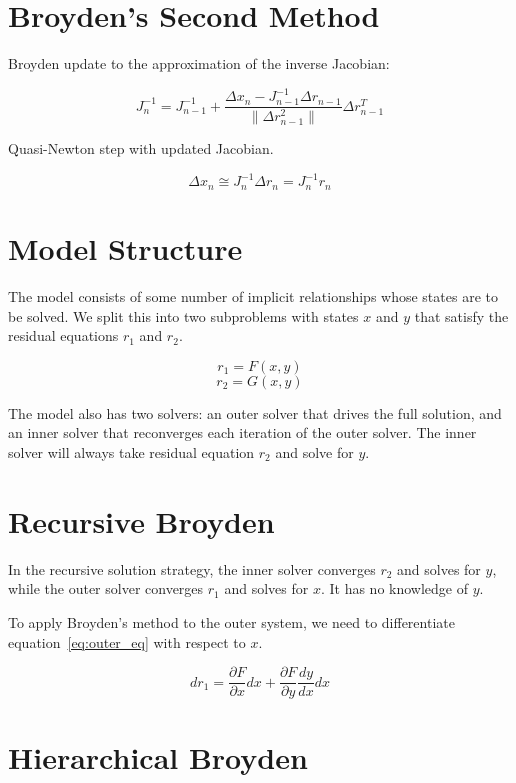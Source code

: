 \documentclass{article}
\begin{document}
\section{Broyden's Second Method}

Broyden update to the approximation of the inverse Jacobian:

\begin{equation}
  J_n^{-1} = J_{n-1}^{-1} + \frac{\Delta x_n - J_{n-1}^{-1} \Delta r_{n-1}}{\| \Delta r_{n-1}^2 \|} \Delta r_{n-1}^T
\end{equation}

Quasi-Newton step with updated Jacobian.

\begin{equation}
  \Delta x_n \cong J_n^{-1} \Delta r_n = J_n^{-1} r_n  \label{eq:newton_update}
\end{equation}

\section{Model Structure}

The model consists of some number of implicit relationships whose states are to be solved. We split this into two subproblems with
states $x$ and $y$ that satisfy the residual equations $r_1$ and $r_2$.

\begin{equation}
  r_1 = F(x, y)  \label{eq:outer_eq}
\end{equation}
\begin{equation}
  r_2 = G(x, y)  \label{eq:inner_eq}
\end{equation}

The model also has two solvers: an outer solver that drives the full solution, and an inner solver that reconverges each
iteration of the outer solver. The inner solver will always take residual equation $r_2$ and solve for $y$.

\section{Recursive Broyden}

In the recursive solution strategy, the inner solver converges $r_2$ and solves for $y$, while the outer solver converges
$r_1$ and solves for $x$.  It has no knowledge of $y$.

To apply Broyden's method to the outer system, we need to differentiate equation~\eqref{eq:outer_eq} with respect to $x$.

\begin{equation}
  dr_1 = \frac{\partial F}{\partial x} dx + \frac{\partial F}{\partial y} \frac{dy}{dx} dx
\end{equation}

\section{Hierarchical Broyden}
\end{document}
